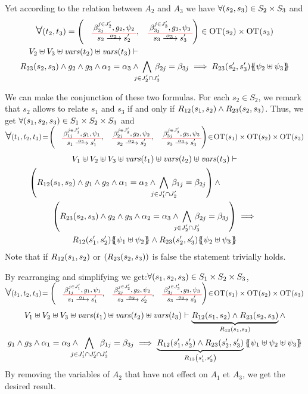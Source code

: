 \documentclass[runningheads]{llncs}
\begin{document}
\begin{enumerate}
Yet according to the relation between   $A_2$ and $A_3$ we have  $\forall {\left(s_2,s_3\right)} \in S_2 \times S_3$ and
\begin{multline*}
\bigsymb{\forall} \mpar{t_2, t_{3}} = \mpar{\OTx{2}{}{2}{2}, \OTx{3}{}{3}{3}} \in \fOT{s_2} \times \fOT{s_3} \\  V_2 \uplus V_3 \uplus \fvars{t_2} \uplus \fvars{t_3} \vdash \hspace{6cm}\\  R_{23}\mpar{s_2, s_3} \wedge 	g_2 \wedge g_{3} \wedge \alpha_2 = \alpha_{3} \wedge \bigwedge_\subbox{j \in J'_2 \cap J'_{3}} \beta_{2j} = \beta_{3j} \implies  R_{23}\mpar{s'_2, s'_{3}}\psubst{\psi_2 \uplus \psi_3}
\end{multline*}

We can make the conjunction of these two formulas.  For each $s_2 \in S_2$, we remark that  $s_2$  allows to relate $s_1$ and $s_3$ if and only if $R_{12}{\left(s_1, s_2\right)}\land R_{23}{\left(s_2, s_3\right)} $. Thus, we get  $\forall {\left(s_1,s_2,s_3\right)} \in S_1\times S_2 \times S_3$ and $\bigsymb{\forall} \mpar{t_1,t_2, t_{3}}\!=\! \mpar{\OTx{1}{}{1}{1},\OTx{2}{}{2}{2},\OTx{3}{}{3}{3}}\! \in\! \fOT{s_1} \times\fOT{s_2} \times \fOT{s_3}$  
\begin{multline*}
V_1\uplus V_2 \uplus V_3 \uplus \fvars{t_1} \uplus \fvars{t_2} \uplus \fvars{t_3} \vdash\\ \left(R_{12}\mpar{s_1, s_2} \wedge   g_1 \wedge g_{2} \wedge \alpha_1 = \alpha_{2} \wedge \bigwedge_\subbox{j \in J'_1 \cap J'_{2}} \beta_{1j} = \beta_{2j}\right) \wedge \hspace{2.5cm}\\ \mpar{R_{23}\mpar{s_2, s_3} 
\wedge  g_2 \wedge g_{3} \wedge \alpha_2 = \alpha_{3} \wedge \bigwedge_\subbox{j \in J'_2 \cap J'_{3}} \beta_{2j} = \beta_{3j}} \implies\\ R_{12}\mpar{s'_1, s'_{2}}\psubst{\psi_1 \uplus \psi_2} \wedge R_{23}\mpar{s'_2, s'_{3}}\psubst{\psi_2 \uplus \psi_3}
\end{multline*}
Note that if  $R_{12}{\left(s_1, s_2\right)}$ or $ {\left(R_{23}{\left(s_2, s_3\right)}\right)}$ is false the statement trivially holds.

By rearranging and simplifying we get:$\forall {\left(s_1,s_2,s_3\right)} \in S_1\times S_2 \times S_3$, $ \bigsymb{\forall} \mpar{t_1,t_2, t_{3}}\!=\! \\\mpar{\OTx{1}{}{1}{1},\OTx{2}{}{2}{2},\OTx{3}{}{3}{3}}\! \in\! \fOT{s_1} \times\fOT{s_2} \times \fOT{s_3}$\\
\begin{multline*}
V_1\uplus V_2 \uplus V_3 \uplus \fvars{t_1} \uplus \fvars{t_2} \uplus \fvars{t_3} \vdash \underbrace{R_{12}\mpar{s_1, s_2} \wedge  R_{23}\mpar{s_2, s_3}}_{R_{13}\mpar{s_1, s_3}} \wedge \\ g_1  \wedge g_{3}
\wedge \alpha_1 = \alpha_{3}  \wedge \bigwedge_\subbox{j \in J'_1\cap J'_2 \cap J'_{3}} \beta_{1j} = \beta_{3j}
 \implies \underbrace{R_{12}\mpar{s'_1, s'_{2}}\wedge R_{23}\mpar{s'_2, s'_{3}}}_{R_{13}\mpar{s'_1, s'_3}} \psubst{\psi_1 \uplus \psi_2\uplus \psi_3 } 
\end{multline*}
By removing the variables of $A_2$ that have not effect on   $A_1$ et  $A_3$, we get the desired result.


\end{enumerate}
\end{document}
